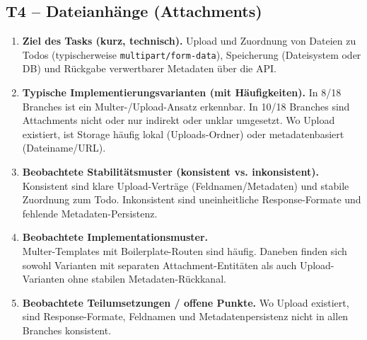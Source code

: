 \subsection*{T4 -- Dateianhänge (Attachments)}
\begin{enumerate}
  \item  \textbf{Ziel des Tasks (kurz, technisch).} Upload und Zuordnung von Dateien zu Todos (typischerweise \texttt{multipart/form-data}), Speicherung (Dateisystem oder DB) und Rückgabe verwertbarer Metadaten über die API.

  \item  \textbf{Typische Implementierungsvarianten (mit Häufigkeiten).} In 8/18 Branches ist ein Multer-/Upload-Ansatz erkennbar. In 10/18 Branches sind Attachments nicht oder nur indirekt oder unklar umgesetzt. Wo Upload existiert, ist Storage häufig lokal (Uploads-Ordner) oder metadatenbasiert (Dateiname/URL).

  \item  \textbf{Beobachtete Stabilitätsmuster (konsistent vs. inkonsistent).} Konsistent sind klare Upload-Verträge (Feldnamen/Metadaten) und stabile Zuordnung zum Todo. Inkonsistent sind uneinheitliche Response-Formate und fehlende Metadaten-Persistenz.

  \item  \textbf{Beobachtete Implementationsmuster.}\\
  Multer-Templates mit Boilerplate-Routen sind häufig. Daneben finden sich sowohl Varianten mit separaten Attachment-Entitäten als auch Upload-Varianten ohne stabilen Metadaten-Rückkanal.

  \item  \textbf{Beobachtete Teilumsetzungen / offene Punkte.} Wo Upload existiert, sind Response-Formate, Feldnamen und Metadatenpersistenz nicht in allen Branches konsistent.
\end{enumerate}

